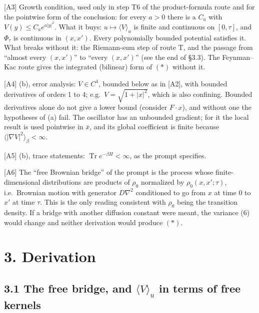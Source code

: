 \documentclass[11pt,a4paper]{article}
\begin{document}
{[}A3{]} Growth condition, used only in step T6 of the product-formula route and for the pointwise form of the conclusion: for every \(a>0\) there is a \(C_a\) with \(V(y)\le C_a e^{a|y|^2}\). What it buys: \(u\mapsto\langle V\rangle_u\) is finite and continuous on \([0,\tau]\), and \(\Phi_\tau\) is continuous in \((x,x')\). Every polynomially bounded potential satisfies it. What breaks without it: the Riemann-sum step of route T, and the passage from ``almost every \((x,x')\)'' to ``every \((x,x')\)'' (see the end of §3.3). The Feynman--Kac route gives the integrated (bilinear) form of \((\ast)\) without it.

{[}A4{]} (b), error analysis: \(V\in C^4\), bounded below as in {[}A2{]}, with bounded derivatives of orders 1 to 4; e.g.~\(V=\sqrt{1+|x|^2}\), which is also confining. Bounded derivatives alone do not give a lower bound (consider \(F\cdot x\)), and without one the hypotheses of (a) fail. The oscillator has an unbounded gradient; for it the local result is used pointwise in \(\bar x\), and its global coefficient is finite because \(\langle|\nabla V|^2\rangle_\beta<\infty\).

{[}A5{]} (b), trace statements: \(\operatorname{Tr}e^{-\beta H}<\infty\), as the prompt specifies.

{[}A6{]} The ``free Brownian bridge'' of the prompt is the process whose finite-dimensional distributions are products of \(\rho_0\) normalized by \(\rho_0(x,x';\tau)\), i.e.~Brownian motion with generator \(D\nabla^2\) conditioned to go from \(x\) at time \(0\) to \(x'\) at time \(\tau\). This is the only reading consistent with \(\rho_0\) being the transition density. If a bridge with another diffusion constant were meant, the variance (6) would change and neither derivation would produce \((\ast)\).

\hypertarget{derivation}{%
\section{3. Derivation}\label{derivation}}

\hypertarget{the-free-bridge-and-langle-vrangle_u-in-terms-of-free-kernels}{%
\subsection{\texorpdfstring{3.1 The free bridge, and \(\langle V\rangle_u\) in terms of free kernels}{3.1 The free bridge, and \textbackslash langle V\textbackslash rangle\_u in terms of free kernels}}\label{the-free-bridge-and-langle-vrangle_u-in-terms-of-free-kernels}}
\end{document}
